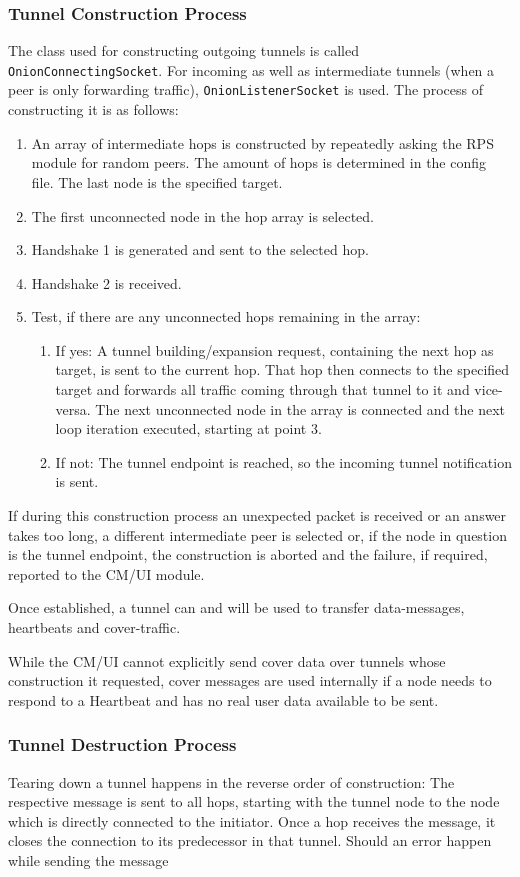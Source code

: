 \documentclass{article}
\begin{document}
	\subsubsection{Tunnel Construction Process}
	The class used for constructing outgoing tunnels is called \texttt{OnionConnectingSocket}. For incoming as well as intermediate tunnels (when a peer is only forwarding traffic), \texttt{OnionListenerSocket} is used. The process of constructing it is as follows:
	\begin{enumerate}
		\item An array of intermediate hops is constructed by repeatedly asking the RPS module for random peers. The amount of hops is determined in the config file. The last node is the specified target.
		\item The first unconnected node in the hop array is selected.
		\item Handshake 1 is generated and sent to the selected hop.
		\item Handshake 2 is received.
		\item Test, if there are any unconnected hops remaining in the array: 
		\begin{enumerate}
			\item If yes: A tunnel building/expansion request, containing the next hop as target, is sent to the current hop. That hop then connects to the specified target and forwards all traffic coming through that tunnel to it and vice-versa. The next unconnected node in the array is connected and the next loop iteration executed, starting at point 3.
			\item If not: The tunnel endpoint is reached, so the incoming tunnel notification is sent.
		\end{enumerate}
	\end{enumerate}
	If during this construction process an unexpected packet is received or an answer takes too long, a different intermediate peer is selected or, if the node in question is the tunnel endpoint, the construction is aborted and the failure, if required, reported to the CM/UI module.
	
	Once established, a tunnel can and will be used to transfer data-messages, heartbeats and cover-traffic. 
	
	While the CM/UI cannot explicitly send cover data over tunnels whose construction it requested, cover messages are used internally if a node needs to respond to a Heartbeat and has no real user data available to be sent.
	
	\subsubsection{Tunnel Destruction Process}
	Tearing down a tunnel happens in the reverse order of construction: The respective message is sent to all hops, starting with the tunnel node to the node which is directly connected to the initiator. Once a hop receives the message, it closes the connection to its predecessor in that tunnel. Should an error happen while sending the message
\end{document}
